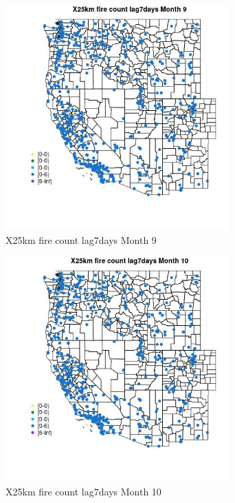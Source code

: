 \begin{figure} 
\centering  
\includegraphics[width=0.77\textwidth]{Code_Outputs/Report_ML_input_PM25_Step4_part_e_de_duplicated_aves_compiled_2019-05-14wNAs_MapObsMo9X25km_fire_count_lag7days.jpg} 
\caption{\label{fig:Report_ML_input_PM25_Step4_part_e_de_duplicated_aves_compiled_2019-05-14wNAsMapObsMo9X25km_fire_count_lag7days}X25km fire count lag7days Month 9} 
\end{figure} 
 

\clearpage 

\begin{figure} 
\centering  
\includegraphics[width=0.77\textwidth]{Code_Outputs/Report_ML_input_PM25_Step4_part_e_de_duplicated_aves_compiled_2019-05-14wNAs_MapObsMo10X25km_fire_count_lag7days.jpg} 
\caption{\label{fig:Report_ML_input_PM25_Step4_part_e_de_duplicated_aves_compiled_2019-05-14wNAsMapObsMo10X25km_fire_count_lag7days}X25km fire count lag7days Month 10} 
\end{figure} 
 

